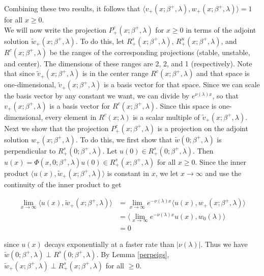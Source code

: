 \documentclass[12pt]{article}
\begin{document}
Combining these two results, it follows that $\langle v_+(x; \beta^+, \lambda), w_+(x; \beta^+, \lambda) \rangle = 1$ for all $x \geq 0$.\\

We will now write the projection $P^c_+(x; \beta^+, \lambda)$ for $x \geq 0$ in terms of the adjoint solution $\tilde{w}_+(x; \beta^+, \lambda)$. To do this, let $R^s_+(x; \beta^+, \lambda)$, $R^u_+(x; \beta^+, \lambda)$, and $R^c(x; \beta^+, \lambda)$ be the ranges of the corresponding projections (stable, unstable, and center). The dimensions of these ranges are 2, 2, and 1 (respectively). Note that since $\tilde{v}_+(x; \beta^+, \lambda)$ is in the center range $R^c(x; \beta^+, \lambda)$ and that space is one-dimensional, $\tilde{v}_+(x; \beta^+, \lambda)$ is a basis vector for that space. Since we can scale the basis vector by any constant we want, we can divide by $e^{\nu(\lambda) x}$, so that $v_+(x; \beta^+, \lambda)$ is a basis vector for $R^c(x; \beta^+, \lambda)$. Since this space is one-dimensional, every element in $R^c(x; \lambda)$ is a scalar multiple of $\tilde{v}_+(x; \beta^+, \lambda)$. \\

Next we show that the projection $P^c_+(x; \beta^+, \lambda)$ is a projection on the adjoint solution $w_+(x; \beta^+, \lambda)$. To do this, we first show that $\tilde{w}(0; \beta^+, \lambda)$ is perpendicular to $R^s_+(0; \beta^+, \lambda)$. Let $u(0) \in R^s_+(0; \beta^+, \lambda)$. Then $u(x) = \Phi(x, 0; \beta^+, \lambda)u(0) \in R^s_+(x; \beta^+, \lambda)$ for all $x \geq 0$. Since the inner product $\langle u(x), \tilde{w}_+(x; \beta^+, \lambda) \rangle$ is constant in $x$, we let $x \rightarrow \infty$ and use the continuity of the inner product to get

\begin{align*}
\lim_{x \rightarrow \infty} \langle u(x), \tilde{w}_+(x; \beta^+, \lambda) \rangle &= \lim_{x \rightarrow \infty} e^{-\nu(\lambda) x} \langle u(x), w_+(x; \beta^+, \lambda) \rangle \\
&= \langle \lim_{x \rightarrow \infty} e^{-\nu(\lambda) x} u(x), w_0(\lambda) \rangle \\
&= 0
\end{align*}

since $u(x)$ decays exponentially at a faster rate than $|\nu(\lambda)|$. Thus we have $\tilde{w}(0; \beta^+, \lambda) \perp R^s(0; \beta^+, \lambda)$. By Lemma \ref{perpeigs}, $\tilde{w}_+(x; \beta^+, \lambda) \perp R^s_+(x; \beta^+, \lambda)$ for all $ \geq 0$.\\
\end{document}
